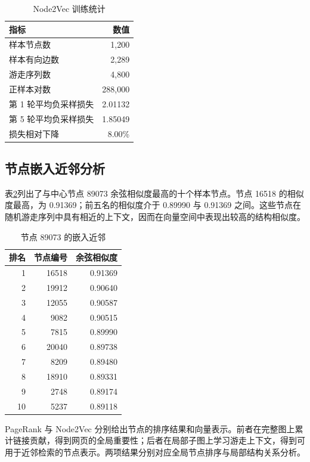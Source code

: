 \documentclass[UTF8,a4paper,12pt,fontset=windows]{ctexart}
\begin{document}
\begin{table}[H]
\centering
\caption{Node2Vec 训练统计}\label{tab:n2v}
\begin{tabular}{lr}
\toprule
指标 & 数值\\
\midrule
样本节点数 & 1,200\\
样本有向边数 & 2,289\\
游走序列数 & 4,800\\
正样本对数 & 288,000\\
第 1 轮平均负采样损失 & 2.01132\\
第 5 轮平均负采样损失 & 1.85049\\
损失相对下降 & 8.00\%\\
\bottomrule
\end{tabular}
\end{table}

\subsection{节点嵌入近邻分析}
表\ref{tab:neighbors}列出了与中心节点 89073 余弦相似度最高的十个样本节点。节点 16518 的相似度最高，为 0.91369；前五名的相似度介于 0.89990 与 0.91369 之间。这些节点在随机游走序列中具有相近的上下文，因而在向量空间中表现出较高的结构相似度。

\begin{table}[H]
\centering
\caption{节点 89073 的嵌入近邻}\label{tab:neighbors}
\begin{tabular}{rrr}
\toprule
排名 & 节点编号 & 余弦相似度\\
\midrule
1 & 16518 & 0.91369\\
2 & 19912 & 0.90640\\
3 & 12055 & 0.90587\\
4 & 9082 & 0.90515\\
5 & 7815 & 0.89990\\
6 & 20040 & 0.89738\\
7 & 8209 & 0.89480\\
8 & 18910 & 0.89331\\
9 & 2748 & 0.89174\\
10 & 5237 & 0.89118\\
\bottomrule
\end{tabular}
\end{table}

PageRank 与 Node2Vec 分别给出节点的排序结果和向量表示。前者在完整图上累计链接贡献，得到网页的全局重要性；后者在局部子图上学习游走上下文，得到可用于近邻检索的节点表示。两项结果分别对应全局节点排序与局部结构关系分析。
\end{document}
